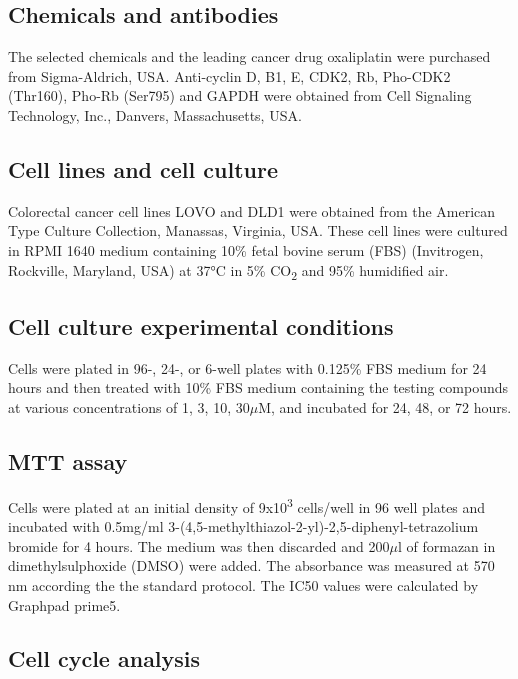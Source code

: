 \subsection{Chemicals and antibodies}

The selected chemicals and the leading cancer drug oxaliplatin were purchased from Sigma-Aldrich, USA. Anti-cyclin D, B1, E, CDK2, Rb, Pho-CDK2 (Thr160), Pho-Rb (Ser795) and GAPDH were obtained from Cell Signaling Technology, Inc., Danvers, Massachusetts, USA.

\subsection{Cell lines and cell culture}

Colorectal cancer cell lines LOVO and DLD1 were obtained from the American Type Culture Collection, Manassas, Virginia, USA. These cell lines were cultured in RPMI 1640 medium containing 10\% fetal bovine serum (FBS) (Invitrogen, Rockville, Maryland, USA) at 37°C in 5\% CO\textsubscript{2} and 95\% humidified air.

\subsection{Cell culture experimental conditions}

Cells were plated in 96-, 24-, or 6-well plates with 0.125\% FBS medium for 24 hours and then treated with 10\% FBS medium containing the testing compounds at various concentrations of 1, 3, 10, 30$\mu$M, and incubated for 24, 48, or 72 hours.

\subsection{MTT assay}

Cells were plated at an initial density of 9x10\textsuperscript{3} cells/well in 96 well plates and incubated with 0.5mg/ml 3-(4,5-methylthiazol-2-yl)-2,5-diphenyl-tetrazolium bromide for 4 hours. The medium was then discarded and 200$\mu$l of formazan in dimethylsulphoxide (DMSO) were added. The absorbance was measured at 570 nm according the the standard protocol. The IC50 values were calculated by Graphpad prime5.

\subsection{Cell cycle analysis}

